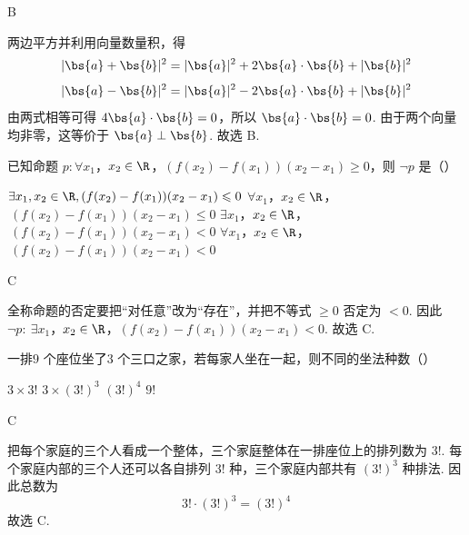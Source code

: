 \begin{answer}
B
\end{answer}

\begin{solution}
两边平方并利用向量数量积，得
\[
|\bs{a}+\bs{b}|^2=|\bs{a}|^2+2\bs{a}\cdot\bs{b}+|\bs{b}|^2
\]
\[
|\bs{a}-\bs{b}|^2=|\bs{a}|^2-2\bs{a}\cdot\bs{b}+|\bs{b}|^2
\]
由两式相等可得 \(4\bs{a}\cdot\bs{b}=0\)，所以 \(\bs{a}\cdot\bs{b}=0\). 由于两个向量均非零，这等价于 \(\bs{a}\perp\bs{b}\). 故选 B.
\end{solution}

\begin{problem}
已知命题 \(p: \forall x_1\)，\(x_2 \in \R\)，\((f(x_2) - f(x_1))(x_2 - x_1) \geqslant 0\)，则 \(\neg p\) 是（\quad）

\choices
    {\(\exists x_{1}, x_{2} \in \R, (f(x_{2}) - f(x_{1}))(x_{2} - x_{1}) \leqslant 0\)}
    {\(\forall x_{1}\)，\(x_{2} \in \R\)，\(\ (f(x_{2}) - f(x_{1}))(x_{2} - x_{1}) \leqslant 0\)}
    {\(\exists x_{1}\)，\(x_{2} \in \R\)，\(\ (f(x_{2}) - f(x_{1}))(x_{2} - x_{1}) < 0\)}
    {\(\forall x_{1}\)，\(x_{2} \in \R\)，\(\ (f(x_{2}) - f(x_{1}))(x_{2} - x_{1}) < 0\)}
\end{problem}

\begin{answer}
C
\end{answer}

\begin{solution}
全称命题的否定要把“对任意”改为“存在”，并把不等式 \(\geqslant 0\) 否定为 \(<0\). 因此
\(\neg p:\ \exists x_1\)，\(x_2\in\R\)，\((f(x_2)-f(x_1))(x_2-x_1)<0\).
故选 C.
\end{solution}

\begin{problem}
一排\(9\) 个座位坐了\(3\) 个三口之家，若每家人坐在一起，则不同的坐法种数（\quad）

\choices
    {\(3 \times 3!\)}
    {\(3 \times (3!)^{3}\)}
    {\((3!)^{4}\)}
    {\(9! \)}
\end{problem}

\begin{answer}
C
\end{answer}

\begin{solution}
把每个家庭的三个人看成一个整体，三个家庭整体在一排座位上的排列数为 \(3!\). 每个家庭内部的三个人还可以各自排列 \(3!\) 种，三个家庭内部共有 \((3!)^3\) 种排法. 因此总数为
\[
3!\cdot(3!)^3=(3!)^4
\]
故选 C.
\end{solution}

